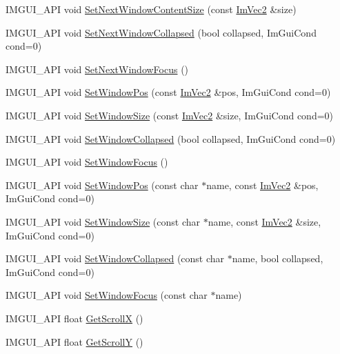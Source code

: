 \begin{DoxyCompactItemize}
I\+M\+G\+U\+I\+\_\+\+A\+PI void \hyperlink{namespace_im_gui_aae55a58c38d8e84b10eb1e8b1531372d}{Set\+Next\+Window\+Content\+Size} (const \hyperlink{struct_im_vec2}{Im\+Vec2} \&size)
\item 
I\+M\+G\+U\+I\+\_\+\+A\+PI void \hyperlink{namespace_im_gui_a3e9380e253a3c49665a404e56950a52a}{Set\+Next\+Window\+Collapsed} (bool collapsed, Im\+Gui\+Cond cond=0)
\item 
I\+M\+G\+U\+I\+\_\+\+A\+PI void \hyperlink{namespace_im_gui_ac2d2b163c95cd8c8391aba85bc50d170}{Set\+Next\+Window\+Focus} ()
\item 
I\+M\+G\+U\+I\+\_\+\+A\+PI void \hyperlink{namespace_im_gui_aaa81e004de4c0a5cedb836e92e8aa0e5}{Set\+Window\+Pos} (const \hyperlink{struct_im_vec2}{Im\+Vec2} \&pos, Im\+Gui\+Cond cond=0)
\item 
I\+M\+G\+U\+I\+\_\+\+A\+PI void \hyperlink{namespace_im_gui_a657c6cc2246485332f608a5204447ea1}{Set\+Window\+Size} (const \hyperlink{struct_im_vec2}{Im\+Vec2} \&size, Im\+Gui\+Cond cond=0)
\item 
I\+M\+G\+U\+I\+\_\+\+A\+PI void \hyperlink{namespace_im_gui_ab5445711a74e0e1a58d1e464cdda252f}{Set\+Window\+Collapsed} (bool collapsed, Im\+Gui\+Cond cond=0)
\item 
I\+M\+G\+U\+I\+\_\+\+A\+PI void \hyperlink{namespace_im_gui_ac71920931ed7b7c8594ee84c6a94e7b8}{Set\+Window\+Focus} ()
\item 
I\+M\+G\+U\+I\+\_\+\+A\+PI void \hyperlink{namespace_im_gui_a32032b56f975bb3145adbe19f38f3b56}{Set\+Window\+Pos} (const char $\ast$name, const \hyperlink{struct_im_vec2}{Im\+Vec2} \&pos, Im\+Gui\+Cond cond=0)
\item 
I\+M\+G\+U\+I\+\_\+\+A\+PI void \hyperlink{namespace_im_gui_a441528b9198d4531e79337121212cd33}{Set\+Window\+Size} (const char $\ast$name, const \hyperlink{struct_im_vec2}{Im\+Vec2} \&size, Im\+Gui\+Cond cond=0)
\item 
I\+M\+G\+U\+I\+\_\+\+A\+PI void \hyperlink{namespace_im_gui_ac349187d6aae141cd3b4476e54bcc338}{Set\+Window\+Collapsed} (const char $\ast$name, bool collapsed, Im\+Gui\+Cond cond=0)
\item 
I\+M\+G\+U\+I\+\_\+\+A\+PI void \hyperlink{namespace_im_gui_aa612adbb975051090898f094a1608f24}{Set\+Window\+Focus} (const char $\ast$name)
\item 
I\+M\+G\+U\+I\+\_\+\+A\+PI float \hyperlink{namespace_im_gui_a6f88335d87da3be81dc6e24cb1812923}{Get\+ScrollX} ()
\item 
I\+M\+G\+U\+I\+\_\+\+A\+PI float \hyperlink{namespace_im_gui_a3c924a2eeb8b2ddfb40ea17be7ea12a6}{Get\+ScrollY} ()

\end{DoxyCompactItemize}
